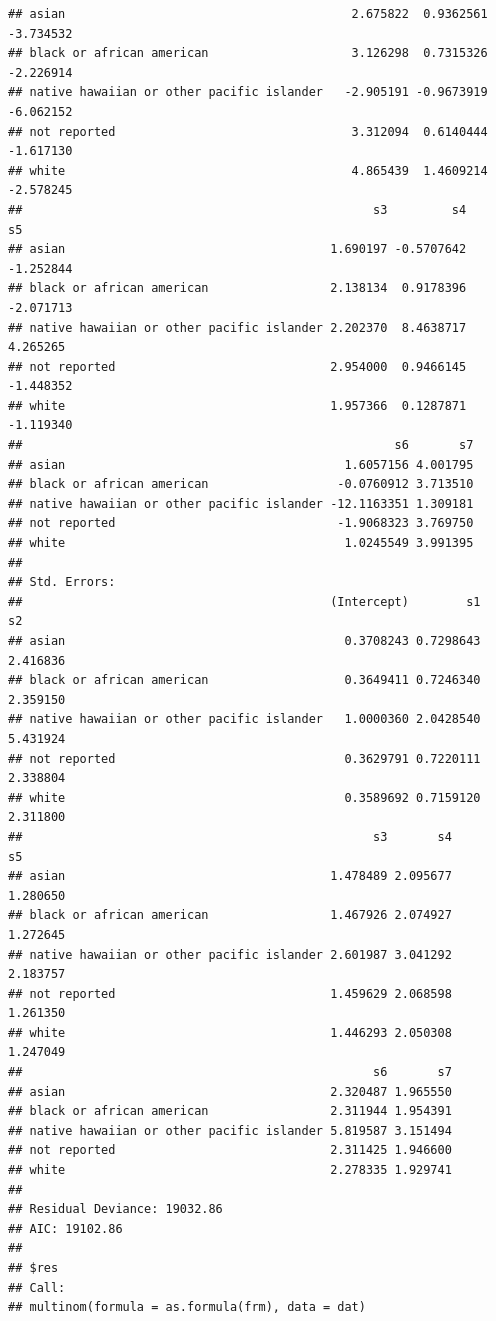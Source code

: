\documentclass{article}\usepackage[]{graphicx}\usepackage[]{color}
\makeatletter
\newenvironment{kframe}{%
 \def\at@end@of@kframe{}%
 \ifinner\ifhmode%
  \def\at@end@of@kframe{\end{minipage}}%
  \begin{minipage}{\columnwidth}%
 \fi\fi%
 \def\FrameCommand##1{\hskip\@totalleftmargin \hskip-\fboxsep
 \colorbox{shadecolor}{##1}\hskip-\fboxsep
     \hskip-\linewidth \hskip-\@totalleftmargin \hskip\columnwidth}%
 \MakeFramed {\advance\hsize-\width
   \@totalleftmargin\z@ \linewidth\hsize
   \@setminipage}}%
 {\par\unskip\endMakeFramed%
 \at@end@of@kframe}
\newenvironment{knitrout}{}{} %
\makeatother
\begin{document}
\begin{knitrout}
\begin{kframe}
\begin{verbatim}
## asian                                        2.675822  0.9362561 -3.734532
## black or african american                    3.126298  0.7315326 -2.226914
## native hawaiian or other pacific islander   -2.905191 -0.9673919 -6.062152
## not reported                                 3.312094  0.6140444 -1.617130
## white                                        4.865439  1.4609214 -2.578245
##                                                 s3         s4        s5
## asian                                     1.690197 -0.5707642 -1.252844
## black or african american                 2.138134  0.9178396 -2.071713
## native hawaiian or other pacific islander 2.202370  8.4638717  4.265265
## not reported                              2.954000  0.9466145 -1.448352
## white                                     1.957366  0.1287871 -1.119340
##                                                    s6       s7
## asian                                       1.6057156 4.001795
## black or african american                  -0.0760912 3.713510
## native hawaiian or other pacific islander -12.1163351 1.309181
## not reported                               -1.9068323 3.769750
## white                                       1.0245549 3.991395
## 
## Std. Errors:
##                                           (Intercept)        s1       s2
## asian                                       0.3708243 0.7298643 2.416836
## black or african american                   0.3649411 0.7246340 2.359150
## native hawaiian or other pacific islander   1.0000360 2.0428540 5.431924
## not reported                                0.3629791 0.7220111 2.338804
## white                                       0.3589692 0.7159120 2.311800
##                                                 s3       s4       s5
## asian                                     1.478489 2.095677 1.280650
## black or african american                 1.467926 2.074927 1.272645
## native hawaiian or other pacific islander 2.601987 3.041292 2.183757
## not reported                              1.459629 2.068598 1.261350
## white                                     1.446293 2.050308 1.247049
##                                                 s6       s7
## asian                                     2.320487 1.965550
## black or african american                 2.311944 1.954391
## native hawaiian or other pacific islander 5.819587 3.151494
## not reported                              2.311425 1.946600
## white                                     2.278335 1.929741
## 
## Residual Deviance: 19032.86 
## AIC: 19102.86 
## 
## $res
## Call:
## multinom(formula = as.formula(frm), data = dat)

\end{verbatim}
\end{kframe}
\end{knitrout}
\end{document}
